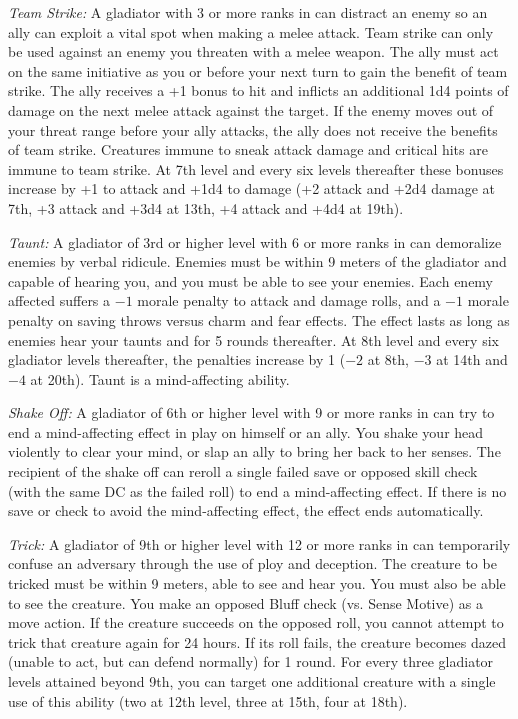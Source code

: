 \textit{Team Strike:} A gladiator with 3 or more ranks in  can distract an enemy so an ally can exploit a vital spot when making a melee attack. Team strike can only be used against an enemy you threaten with a melee weapon. The ally must act on the same initiative as you or before your next turn to gain the benefit of team strike. The ally receives a +1 bonus to hit and inflicts an additional 1d4 points of damage on the next melee attack against the target. If the enemy moves out of your threat range before your ally attacks, the ally does not receive the benefits of team strike. Creatures immune to sneak attack damage and critical hits are immune to team strike. At 7th level and every six levels thereafter these bonuses increase by +1 to attack and +1d4 to damage (+2 attack and +2d4 damage at 7th, +3 attack and +3d4 at 13th, +4 attack and +4d4 at 19th).

\textit{Taunt:} A gladiator of 3rd or higher level with 6 or more ranks in  can demoralize enemies by verbal ridicule. Enemies must be within 9 meters of the gladiator and capable of hearing you, and you must be able to see your enemies. Each enemy affected suffers a $-1$ morale penalty to attack and damage rolls, and a $-1$ morale penalty on saving throws versus charm and fear effects. The effect lasts as long as enemies hear your taunts and for 5 rounds thereafter. At 8th level and every six gladiator levels thereafter, the penalties increase by 1 ($-2$ at 8th, $-3$ at 14th and $-4$ at 20th). Taunt is a mind-affecting ability.

\textit{Shake Off:} A gladiator of 6th or higher level with 9 or more ranks in  can try to end a mind-affecting effect in play on himself or an ally. You shake your head violently to clear your mind, or slap an ally to bring her back to her senses. The recipient of the shake off can reroll a single failed save or opposed skill check (with the same DC as the failed roll) to end a mind-affecting effect. If there is no save or check to avoid the mind-affecting effect, the effect ends automatically.

\textit{Trick:} A gladiator of 9th or higher level with 12 or more ranks in  can temporarily confuse an adversary through the use of ploy and deception. The creature to be tricked must be within 9 meters, able to see and hear you. You must also be able to see the creature. You make an opposed Bluff check (vs. Sense Motive) as a move action. If the creature succeeds on the opposed roll, you cannot attempt to trick that creature again for 24 hours. If its roll fails, the creature becomes dazed (unable to act, but can defend normally) for 1 round. For every three gladiator levels attained beyond 9th, you can target one additional creature with a single use of this ability (two at 12th level, three at 15th, four at 18th).

